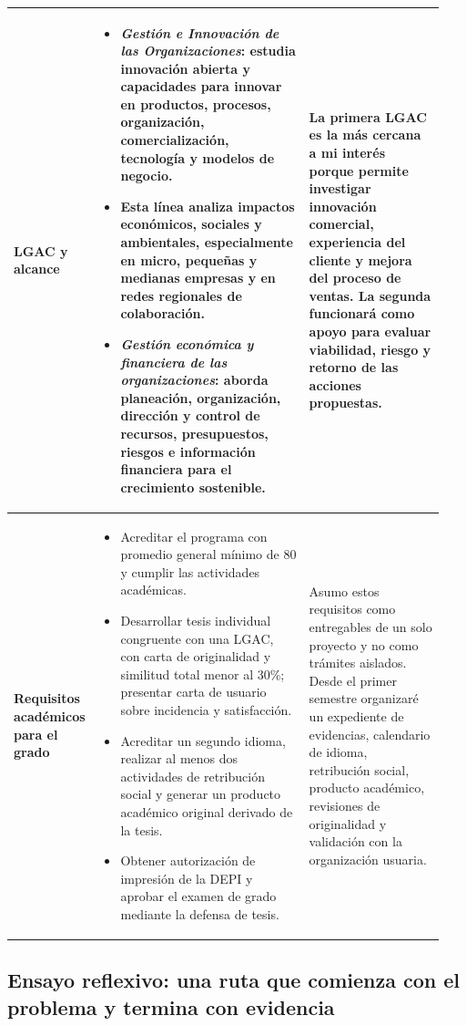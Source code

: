 \documentclass[spanish,letterpaper,oneside]{article}
\begin{document}
\begin{landscape}
\begin{longtable}{@{}p{0.15\linewidth}p{0.48\linewidth}p{0.31\linewidth}@{}}
\midrule
\textbf{LGAC y alcance} &
\begin{itemize}
 \item \emph{Gestión e Innovación de las Organizaciones}: estudia innovación abierta y capacidades para innovar en productos, procesos, organización, comercialización, tecnología y modelos de negocio.
 \item Esta línea analiza impactos económicos, sociales y ambientales, especialmente en micro, pequeñas y medianas empresas y en redes regionales de colaboración.
 \item \emph{Gestión económica y financiera de las organizaciones}: aborda planeación, organización, dirección y control de recursos, presupuestos, riesgos e información financiera para el crecimiento sostenible.
\end{itemize} &
La primera LGAC es la más cercana a mi interés porque permite investigar innovación comercial, experiencia del cliente y mejora del proceso de ventas. La segunda funcionará como apoyo para evaluar viabilidad, riesgo y retorno de las acciones propuestas. \\
\midrule
\textbf{Requisitos académicos para el grado} &
\begin{itemize}
 \item Acreditar el programa con promedio general mínimo de 80 y cumplir las actividades académicas.
 \item Desarrollar tesis individual congruente con una LGAC, con carta de originalidad y similitud total menor al 30\%; presentar carta de usuario sobre incidencia y satisfacción.
 \item Acreditar un segundo idioma, realizar al menos dos actividades de retribución social y generar un producto académico original derivado de la tesis.
 \item Obtener autorización de impresión de la DEPI y aprobar el examen de grado mediante la defensa de tesis.
\end{itemize} &
Asumo estos requisitos como entregables de un solo proyecto y no como trámites aislados. Desde el primer semestre organizaré un expediente de evidencias, calendario de idioma, retribución social, producto académico, revisiones de originalidad y validación con la organización usuaria. \\
\bottomrule
\end{longtable}
\endgroup
\end{landscape}

\subsection{Ensayo reflexivo: una ruta que comienza con el problema y termina con evidencia}
\end{document}
